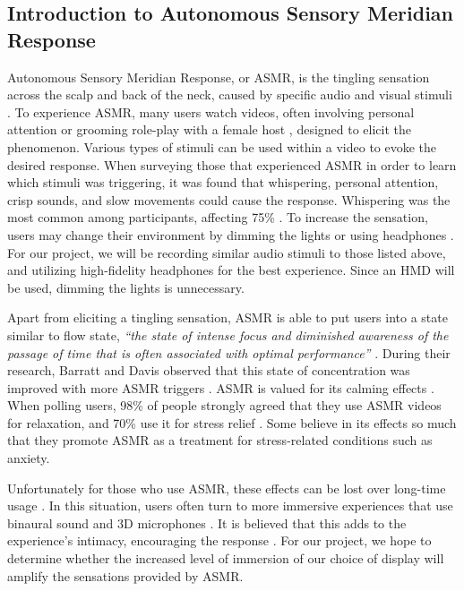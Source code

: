 \documentclass{sigchi}
\newcommand{\inlinequote}[1]{\textit{``#1''}}
\begin{document}
\subsection{Introduction to Autonomous Sensory Meridian Response}
Autonomous Sensory Meridian Response, or ASMR, is the tingling sensation across the scalp and back of the neck, caused by specific audio and visual stimuli \cite{barratt2015autonomous}. To experience ASMR, many users watch videos, often involving personal attention or grooming role-play \cite{andersen2015now,barratt2015autonomous} with a female host \cite{andersen2015now}, designed to elicit the phenomenon. Various types of stimuli can be used within a video to evoke the desired response\cite{barratt2015autonomous}. When surveying those that experienced ASMR in order to learn which stimuli was triggering, it was found that whispering, personal attention, crisp sounds, and slow movements could cause the response. Whispering was the most common among participants, affecting 75\% \cite{barratt2015autonomous}. To increase the sensation, users may change their environment by dimming the lights or using headphones \cite{begman2015}. For our project, we will be recording similar audio stimuli to those listed above, and utilizing high-fidelity headphones for the best experience. Since an HMD will be used, dimming the lights is unnecessary.

Apart from eliciting a tingling sensation, ASMR is able to put users into a state similar to flow state, \inlinequote{the state of intense focus and diminished awareness of the passage of time that is often associated with optimal performance} \cite{barratt2015autonomous}. During their research, Barratt and Davis observed that this state of concentration was improved with more ASMR triggers \cite{barratt2015autonomous}. ASMR is valued for its calming effects \cite{barratt2015autonomous}. When polling users, 98\% of people strongly agreed that they use ASMR videos for relaxation, and 70\% use it for stress relief \cite{barratt2015autonomous}. Some believe in its effects so much that they promote ASMR as a treatment for stress-related conditions such as anxiety\cite{andersen2015now,begman2015}.

Unfortunately for those who use ASMR, these effects can be lost over long-time usage \cite{andersen2015now}. In this situation, users often turn to more immersive experiences that use binaural sound and 3D microphones \cite{andersen2015now}. It is believed that this adds to the experience’s intimacy, encouraging the response \cite{andersen2015now}. For our project, we hope to determine whether the increased level of immersion of our choice of display will amplify the sensations provided by ASMR.
\end{document}

